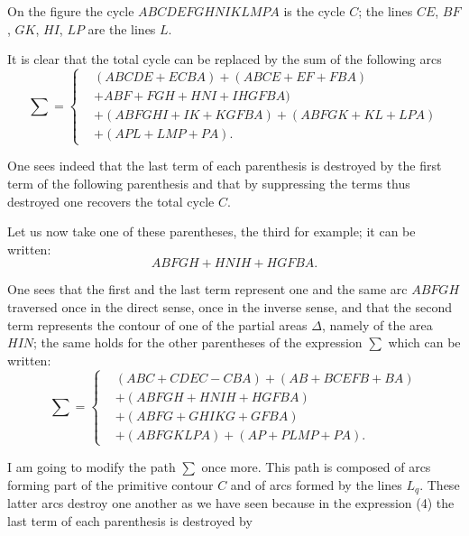 \documentclass{article}
\begin{document}

On the figure the cycle $ABCDEFGHNIKLMPA$ is the cycle $C$; the lines $CE$, $BF$, $GK$, $HI$, $LP$ are the lines $L$.


It is clear that the total cycle can be replaced by the sum of the following arcs
\[ \sum = \left\{ \begin{aligned} &(ABCDE + ECBA) + (ABCE + EF + FBA)\\ &+ ABF + FGH + HNI + IHGFBA)\\ &+ (ABFGHI + IK + KGFBA) + (ABFGK + KL + LPA)\\ &+ (APL + LMP + PA). \end{aligned} \right. \tag{4} \]

One sees indeed that the last term of each parenthesis is destroyed by the first term of the following parenthesis and that by suppressing the terms thus destroyed one recovers the total cycle $C$.

Let us now take one of these parentheses, the third for example; it can be written:
\[ ABFGH + HNIH + HGFBA. \]

One sees that the first and the last term represent one and the same arc $ABFGH$ traversed once in the direct sense, once in the inverse sense, and that the second term represents the contour of one of the partial areas $\Delta$, namely of the area $HIN$; the same holds for the other parentheses of the expression $\displaystyle\sum$ which can be written:
\[ \sum = \left\{ \begin{aligned} &(ABC + CDEC - CBA) + (AB + BCEFB + BA)\\ &+ (ABFGH + HNIH + HGFBA)\\ &+ (ABFG + GHIKG + GFBA)\\ &+ (ABFGKLPA) + (AP + PLMP + PA). \end{aligned} \right. \tag{5} \]

I am going to modify the path $\displaystyle\sum$ once more. This path is composed of arcs forming part of the primitive contour $C$ and of arcs formed by the lines $L_{q}$. These latter arcs destroy one another as we have seen because in the expression (4) the last term of each parenthesis is destroyed by
\end{document}
